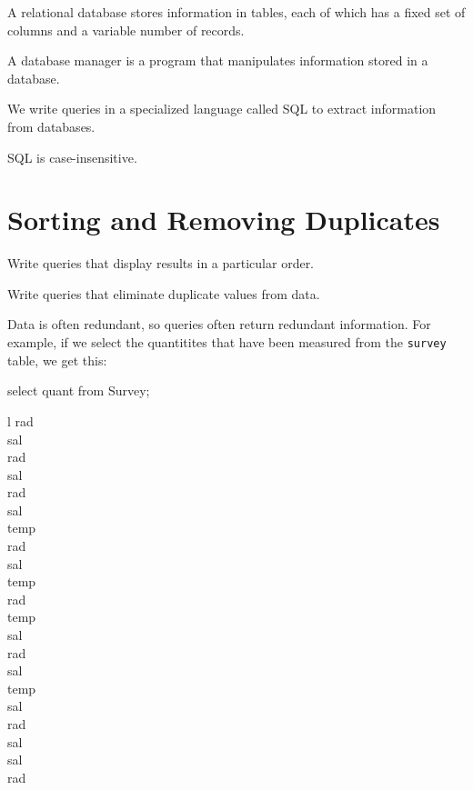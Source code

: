 \begin{keypoints}
\begin{swcitemize}
\item
  A relational database stores information in tables, each of which has
  a fixed set of columns and a variable number of records.
\item
  A database manager is a program that manipulates information stored in
  a database.
\item
  We write queries in a specialized language called SQL to extract
  information from databases.
\item
  SQL is case-insensitive.
\end{swcitemize}
\end{keypoints}

\section{Sorting and Removing Duplicates}

\begin{objectives}
\begin{swcitemize}
\item
  Write queries that display results in a particular order.
\item
  Write queries that eliminate duplicate values from data.
\end{swcitemize}
\end{objectives}

Data is often redundant, so queries often return redundant information.
For example, if we select the quantitites that have been measured from
the \texttt{survey} table, we get this:

\begin{VerbIn}
select quant from Survey;
\end{VerbIn}

\begin{sqltable}{l}
rad \\
sal \\
rad \\
sal \\
rad \\
sal \\
temp \\
rad \\
sal \\
temp \\
rad \\
temp \\
sal \\
rad \\
sal \\
temp \\
sal \\
rad \\
sal \\
sal \\
rad \\
\end{sqltable}

